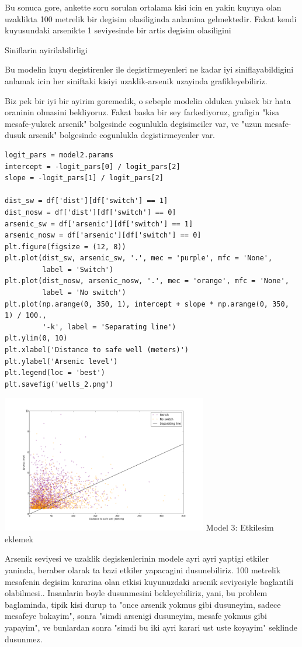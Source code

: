 \documentclass[12pt,fleqn]{article}\usepackage{../common}
\begin{document}
Bu sonuca gore, ankette soru sorulan ortalama kisi icin en yakin
kuyuya olan uzaklikta 100 metrelik bir degisim olasiliginda %
anlamina gelmektedir. Fakat kendi kuyusundaki arsenikte 1 seviyesinde
bir artis degisim olasiligini %

Siniflarin ayirilabilirligi

Bu modelin kuyu degistirenler ile degistirmeyenleri ne kadar iyi
siniflayabildigini anlamak icin her siniftaki kisiyi uzaklik-arsenik
uzayinda grafikleyebiliriz.

Biz pek bir iyi bir ayirim goremedik, o sebeple modelin oldukca yuksek
bir hata oraninin olmasini bekliyoruz. Fakat baska bir sey farkediyoruz,
grafigin "kisa mesafe-yuksek arsenik" bolgesinde cogunlukla degisimciler var,
ve "uzun mesafe-dusuk arsenik" bolgesinde cogunlukla degistirmeyenler var.

\begin{verbatim}
logit_pars = model2.params
intercept = -logit_pars[0] / logit_pars[2]
slope = -logit_pars[1] / logit_pars[2]

dist_sw = df['dist'][df['switch'] == 1]
dist_nosw = df['dist'][df['switch'] == 0]
arsenic_sw = df['arsenic'][df['switch'] == 1]
arsenic_nosw = df['arsenic'][df['switch'] == 0]
plt.figure(figsize = (12, 8))
plt.plot(dist_sw, arsenic_sw, '.', mec = 'purple', mfc = 'None', 
         label = 'Switch')
plt.plot(dist_nosw, arsenic_nosw, '.', mec = 'orange', mfc = 'None', 
         label = 'No switch')
plt.plot(np.arange(0, 350, 1), intercept + slope * np.arange(0, 350, 1) / 100.,
         '-k', label = 'Separating line')
plt.ylim(0, 10)
plt.xlabel('Distance to safe well (meters)')
plt.ylabel('Arsenic level')
plt.legend(loc = 'best')
plt.savefig('wells_2.png')
\end{verbatim}

\includegraphics[height=6cm]{wells_2.png}
Model 3: Etkilesim eklemek

Arsenik seviyesi ve uzaklik degiskenlerinin modele ayri ayri yaptigi
etkiler yaninda, beraber olarak ta bazi etkiler yapacagini
dusunebiliriz.  100 metrelik mesafenin degisim kararina olan etkisi
kuyunuzdaki arsenik seviyesiyle baglantili olabilmesi.. Insanlarin
boyle dusunmesini bekleyebiliriz, yani, bu problem baglaminda, tipik
kisi durup ta "once arsenik yokmus gibi dusuneyim, sadece mesafeye
bakayim", sonra "simdi arsenigi dusuneyim, mesafe yokmus gibi
yapayim", ve bunlardan sonra "simdi bu iki ayri karari ust uste
koyayim" seklinde dusunmez.
\end{document}
